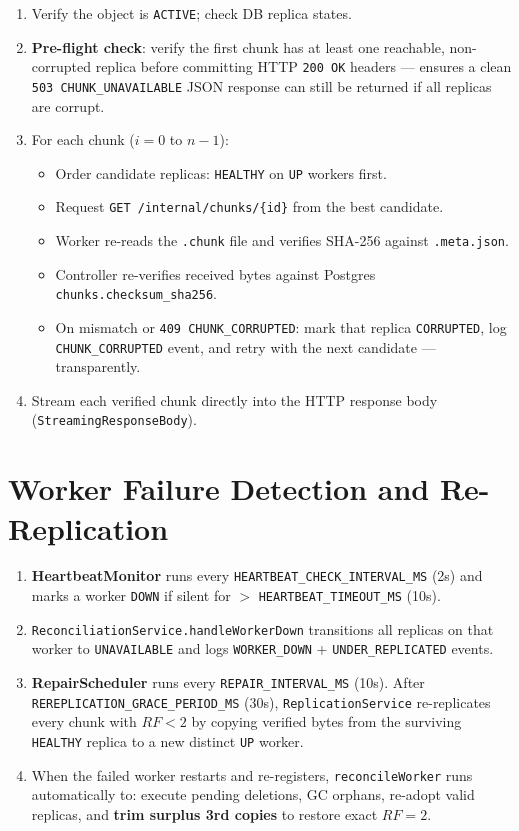 \documentclass[12pt,a4paper]{report}
\begin{document}
\begin{enumerate}[leftmargin=*]
  \item Verify the object is \texttt{ACTIVE}; check DB replica states.
  \item \textbf{Pre-flight check}: verify the first chunk has at least one reachable, non-corrupted replica before committing HTTP \texttt{200 OK} headers --- ensures a clean \texttt{503 CHUNK\_UNAVAILABLE} JSON response can still be returned if all replicas are corrupt.
  \item For each chunk ($i = 0$ to $n-1$):
    \begin{itemize}
      \item Order candidate replicas: \texttt{HEALTHY} on \texttt{UP} workers first.
      \item Request \texttt{GET /internal/chunks/\{id\}} from the best candidate.
      \item Worker re-reads the \texttt{.chunk} file and verifies SHA-256 against \texttt{.meta.json}.
      \item Controller re-verifies received bytes against Postgres \texttt{chunks.checksum\_sha256}.
      \item On mismatch or \texttt{409 CHUNK\_CORRUPTED}: mark that replica \texttt{CORRUPTED}, log \texttt{CHUNK\_CORRUPTED} event, and retry with the next candidate --- transparently.
    \end{itemize}
  \item Stream each verified chunk directly into the HTTP response body (\texttt{StreamingResponseBody}).
\end{enumerate}

\section{Worker Failure Detection and Re-Replication}

\begin{enumerate}[leftmargin=*]
  \item \textbf{HeartbeatMonitor} runs every \texttt{HEARTBEAT\_CHECK\_INTERVAL\_MS} (2s) and marks a worker \texttt{DOWN} if silent for $> $ \texttt{HEARTBEAT\_TIMEOUT\_MS} (10s).
  \item \texttt{ReconciliationService.handleWorkerDown} transitions all replicas on that worker to \texttt{UNAVAILABLE} and logs \texttt{WORKER\_DOWN} + \texttt{UNDER\_REPLICATED} events.
  \item \textbf{RepairScheduler} runs every \texttt{REPAIR\_INTERVAL\_MS} (10s). After \texttt{REREPLICATION\_GRACE\_PERIOD\_MS} (30s), \texttt{ReplicationService} re-replicates every chunk with $RF < 2$ by copying verified bytes from the surviving \texttt{HEALTHY} replica to a new distinct \texttt{UP} worker.
  \item When the failed worker restarts and re-registers, \texttt{reconcileWorker} runs automatically to: execute pending deletions, GC orphans, re-adopt valid replicas, and \textbf{trim surplus 3rd copies} to restore exact $RF = 2$.
\end{enumerate}
\end{document}
